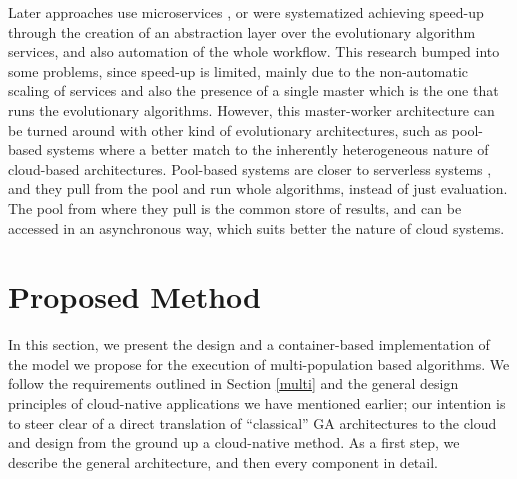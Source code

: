 \documentclass[review]{elsarticle}
\begin{document}
Later approaches use microservices \cite{khalloof2018generic}, or were
systematized \cite{salza2019speed} achieving speed-up through the
creation of an abstraction layer over the evolutionary algorithm
services, and also automation of the whole workflow. This research
bumped into some problems, since speed-up is limited, mainly due to the
non-automatic scaling of services and also the presence of a single
master which is the one that runs the evolutionary
algorithms. However, this master-worker architecture can be turned
around with other kind of evolutionary architectures, such
as pool-based systems
\cite{valenzuela2015implementing,merelo2012sofea,sofea:cec2012} where
a better match to the inherently heterogeneous nature of cloud-based
architectures. Pool-based systems are closer to serverless systems
\cite{malawski2017serverless}, and they pull from the pool and run
whole algorithms, instead of just evaluation. The pool from where they
pull is the common store of results, and can be accessed in an
asynchronous way, which suits better the nature of cloud systems.

\section{Proposed Method} 
\label{method} 

In this section, we present the design
and a container-based implementation of the model we propose for the execution
of multi-population based algorithms. We follow the requirements outlined in
Section \ref{multi} and the general design principles of cloud-native
applications we have mentioned earlier; our intention is to steer
clear of a direct translation of ``classical'' GA architectures to the
cloud and design from the ground up a cloud-native method. As a first step, we describe the general
architecture, and then  every component in detail. 
\end{document}
